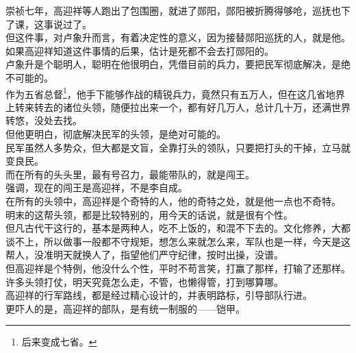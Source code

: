 \begin{multicols}{\theparacolNo}
崇祯七年，高迎祥等人跑出了包围圈，就进了郧阳，郧阳被折腾得够呛，巡抚也下了课，这事说过了。\\

但这件事，对卢象升而言，有着决定性的意义，因为接替郧阳巡抚的人，就是他。\\

如果高迎祥知道这件事情的后果，估计是死都不会去打郧阳的。\\

卢象升是个聪明人，聪明在他很明白，凭借目前的兵力，要把民军彻底解决，是绝不可能的。\\

作为五省总督\footnote{后来变成七省。}，他手下能够作战的精锐兵力，竟然只有五万人，但在这几省地界上转来转去的诸位头领，随便拉出来一个，都有好几万人，总计几十万，还满世界转悠，没处去找。\\

但他更明白，彻底解决民军的头领，是绝对可能的。\\

民军虽然人多势众，但大都是文盲，全靠打头的领队，只要把打头的干掉，立马就变良民。\\

而在所有的头头里，最有号召力，最能带队的，就是闯王。\\

强调，现在的闯王是高迎祥，不是李自成。\\

在所有的头领中，高迎祥是个奇特的人，他的奇特之处，就是他一点也不奇特。\\

明末的这帮头领，都是比较特别的，用今天的话说，就是很有个性。\\

但凡古代干这行的，基本是两种人，吃不上饭的，和混不下去的。文化修养，大都谈不上，所以做事一般都不守规矩，想怎么来就怎么来，军队也是一样，今天是这帮人，没准明天就换人了，指望他们严守纪律，按时出操，没谱。\\

但高迎祥是个特例，他没什么个性，平时不苟言笑，打赢了那样，打输了还那样。\\

许多头领打仗，明天究竟怎么走，不管，也懒得管，打到哪算哪。\\

高迎祥的行军路线，都是经过精心设计的，并表明路标，引导部队行进。\\

更吓人的是，高迎祥的部队，是有统一制服的——铠甲。\\


\end{multicols}

